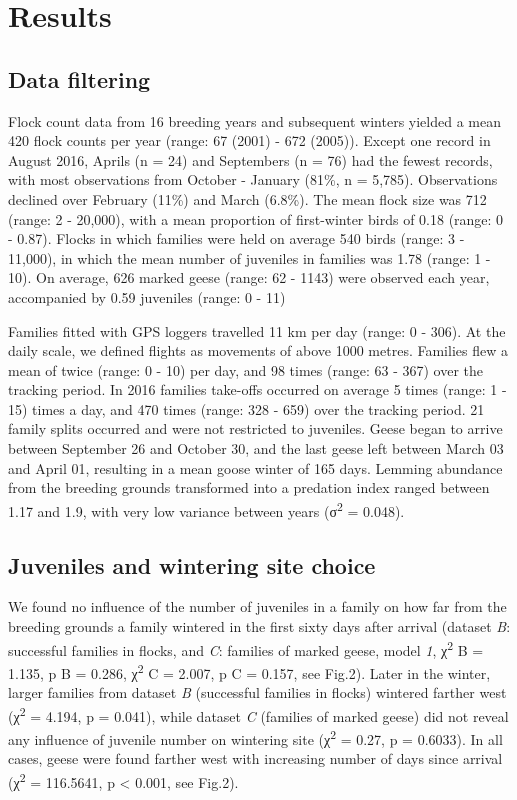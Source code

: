 \documentclass[10pt,twocolumn]{paper}
\begin{document}
\section{Results}\label{results}

\subsection{Data filtering}\label{data-filtering}

Flock count data from 16 breeding years and subsequent winters yielded a
mean 420 flock counts per year (range: 67 (2001) - 672 (2005)). Except
one record in August 2016, Aprils (n = 24) and Septembers (n = 76) had
the fewest records, with most observations from October - January (81\%,
n = 5,785). Observations declined over February (11\%) and March
(6.8\%). The mean flock size was 712 (range: 2 - 20,000), with a mean
proportion of first-winter birds of 0.18 (range: 0 - 0.87). Flocks in
which families were held on average 540 birds (range: 3 - 11,000), in
which the mean number of juveniles in families was 1.78 (range: 1 - 10).
On average, 626 marked geese (range: 62 - 1143) were observed each year,
accompanied by 0.59 juveniles (range: 0 - 11)

Families fitted with GPS loggers travelled 11 km per day (range: 0 -
306). At the daily scale, we defined flights as movements of above 1000
metres. Families flew a mean of twice (range: 0 - 10) per day, and 98
times (range: 63 - 367) over the tracking period. In 2016 families
take-offs occurred on average 5 times (range: 1 - 15) times a day, and
470 times (range: 328 - 659) over the tracking period. 21 family splits
occurred and were not restricted to juveniles. Geese began to arrive
between September 26 and October 30, and the last geese left between
March 03 and April 01, resulting in a mean goose winter of 165 days.
Lemming abundance from the breeding grounds transformed into a predation
index ranged between 1.17 and 1.9, with very low variance between years
(σ\textsuperscript{2} = 0.048).

\subsection{Juveniles and wintering site
choice}\label{juveniles-and-wintering-site-choice}

We found no influence of the number of juveniles in a family on how far
from the breeding grounds a family wintered in the first sixty days
after arrival (dataset \emph{B}: successful families in flocks, and
\emph{C}: families of marked geese, model \emph{1}, χ\textsuperscript{2}
B = 1.135, p B = 0.286, χ\textsuperscript{2} C = 2.007, p C = 0.157, see
Fig.2). Later in the winter, larger families from dataset \emph{B}
(successful families in flocks) wintered farther west
(χ\textsuperscript{2} = 4.194, p = 0.041), while dataset \emph{C}
(families of marked geese) did not reveal any influence of juvenile
number on wintering site (χ\textsuperscript{2} = 0.27, p = 0.6033). In
all cases, geese were found farther west with increasing number of days
since arrival (χ\textsuperscript{2} = 116.5641, p \textless{} 0.001, see
Fig.2).
\end{document}
